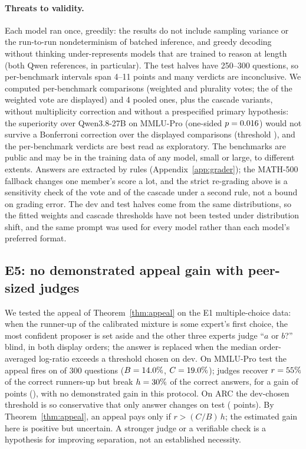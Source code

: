\documentclass[11pt]{article}
\theoremstyle{definition}
\theoremstyle{remark}
\begin{document}
\paragraph{Threats to validity.} Each model ran once, greedily: the results do not include sampling
variance or the run-to-run nondeterminism of batched inference, and greedy decoding without thinking
under-represents models that are trained to reason at length (both Qwen references, in particular). The
test halves have 250--300 questions, so per-benchmark intervals span 4--11 points and many verdicts are
inconclusive. We computed \eFourNComputed{} per-benchmark comparisons (weighted and plurality votes; the
\eFourNShown{} of the weighted vote are displayed) and 4 pooled ones, plus the cascade variants, without
multiplicity correction and without a prespecified primary hypothesis: the superiority over Qwen3.8-27B on
MMLU-Pro (one-sided $p=0.016$) would not survive a Bonferroni correction over the
\eFourNShown{} displayed comparisons (threshold \eFourBonferroniAlpha), and the per-benchmark verdicts are
best read as exploratory. The benchmarks are
public and may be in the training data of any model, small or large, to different extents. Answers are
extracted by rules (Appendix~\ref{app:grader}); the MATH-500 fallback changes one member's score a lot, and
the strict re-grading above is a sensitivity check of the vote and of the cascade under a second rule, not
a bound on grading error. The dev and test halves come from the same
distributions, so the fitted weights and cascade thresholds have not been tested under distribution shift,
and the same prompt was used for every model rather than each model's preferred format.

\subsection{E5: no demonstrated appeal gain with peer-sized judges}\label{sec:e5}
We tested the appeal of Theorem~\ref{thm:appeal} on the E1 multiple-choice data: when the runner-up of
the calibrated mixture is some expert's first choice, the most confident proposer is set aside and the
other three experts judge ``$a$ or $b$?'' blind, in both display orders; the answer is replaced when the
median order-averaged log-ratio exceeds a threshold chosen on dev. On MMLU-Pro test the appeal fires on
\eFiveMmluAppeals{} of 300 questions ($B=14.0\%$, $C=19.0\%$); judges recover
$r=55\%$ of the correct runners-up but break $h=30\%$ of the correct answers, for a gain
of \eFiveMmluGain{} points (\eFiveMmluGainCI), with no demonstrated gain in this protocol. On ARC the dev-chosen
threshold is so
conservative that only \eFiveArcFlips{} answer changes on test (\eFiveArcGain{} points). By
Theorem~\ref{thm:appeal}, an appeal pays only if $r>(C/B)\,h$; the estimated gain here is positive but uncertain.
A stronger judge or a verifiable check is a hypothesis for improving separation, not an established
necessity.
\end{document}
